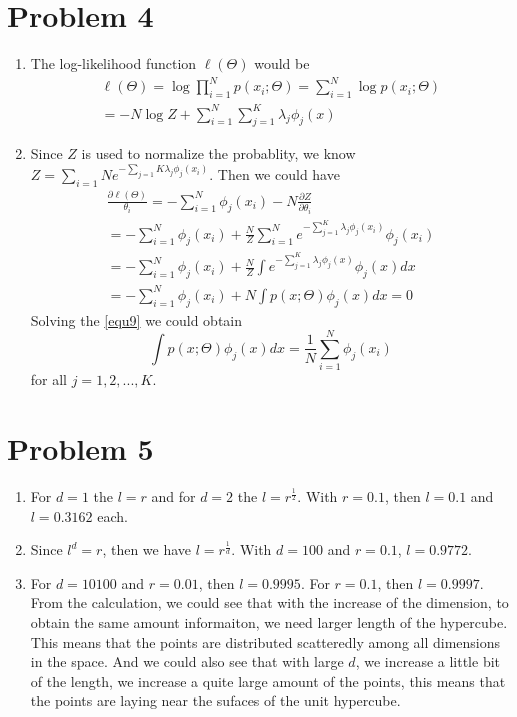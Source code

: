 \documentclass[paper=a4, fontsize=12pt]{scrartcl} %
\numberwithin{equation}{section} %
\numberwithin{figure}{section} %
\numberwithin{table}{section} %
\begin{document}
\section{Problem 4}
\begin{enumerate}
\item The log-likelihood function $\ell(\Theta)$ would be
\begin{equation}
\label{equ8}
\begin{aligned}
\ell(\Theta) = \log \prod_{i=1}^{N}p(x_{i};\Theta) = \sum_{i=1}^{N}\log p(x_{i};\Theta) \\
= -N\log Z + \sum_{i=1}^{N}\sum_{j=1}^{K}\lambda_{j}\phi_{j}(x)
\end{aligned}
\end{equation}
\item Since $Z$ is used to normalize the probablity, we know $Z = \sum_{i=1}{N}e^{-\sum_{j=1}{K}\lambda_{j}\phi_{j}(x_{i})}$. Then we could have 
\begin{equation}
\label{equ9}
\begin{aligned}
\frac{\partial\ell (\Theta)}{\theta_{i}} = -\sum_{i=1}^{N}\phi_{j}(x_{i}) - N\frac{\partial Z}{\partial \theta_{i}} \\
= -\sum_{i=1}^{N}\phi_{j}(x_{i}) + \frac{N}{Z}\sum_{i=1}^{N}e^{-\sum_{j=1}^{K}\lambda_{j}\phi_{j}(x_{i})}\phi_{j}(x_{i}) \\
= -\sum_{i=1}^{N}\phi_{j}(x_{i}) + \frac{N}{Z}\int e^{-\sum_{j=1}^{K}\lambda_{j}\phi_{j}(x)}\phi_{j}(x)dx \\
= -\sum_{i=1}^{N}\phi_{j}(x_{i}) + N\int p(x; \Theta)\phi_{j}(x)dx = 0
\end{aligned}
\end{equation}
Solving the \ref{equ9} we could obtain
\begin{equation}
\int p(x; \Theta)\phi_{j}(x)dx = \frac{1}{N}\sum_{i=1}^{N}\phi_{j}(x_{i})
\end{equation}
for all $j = 1, 2, ..., K$.
\end{enumerate}
\section{Problem 5}
\begin{enumerate}
\item For $d = 1$ the $l = r$ and for $d = 2$ the $l = r^{\frac{1}{2}}$. With $r = 0.1$, then $l = 0.1$ and $l = 0.3162$ each.

\item Since $l^d = r$, then we have $l = r^{\frac{1}{d}}$. With $d = 100$ and $r = 0.1$, $l = 0.9772$.

\item For $d = 10100$ and $r = 0.01$, then $l = 0.9995$. For $r = 0.1$, then $l = 0.9997$. From the calculation, we could see that with the increase of the dimension, to obtain the same amount informaiton, we need larger length of the hypercube. This means that the points are distributed scatteredly among all dimensions in the space. And we could also see that with large $d$, we increase a little bit of the length, we increase a quite large amount of the points, this means that the points are laying near the sufaces of the unit hypercube.
\end{enumerate}
\end{document}
